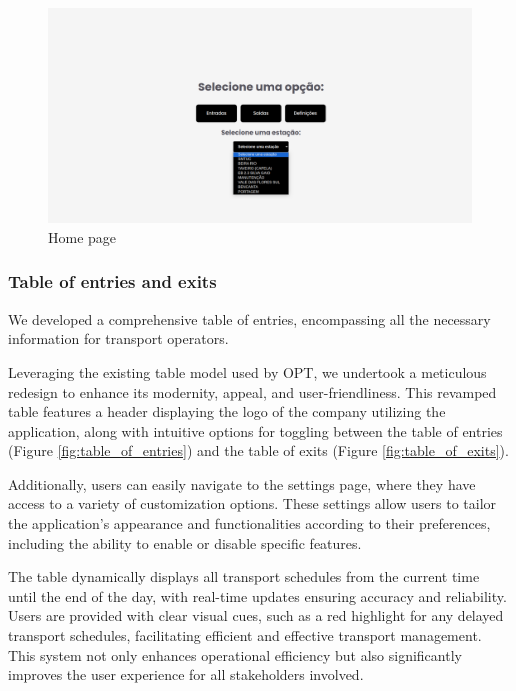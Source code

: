 \documentclass[10pt]{article}
\begin{document}
        \vfill
        \begin{figure}[htbp]
            \centering
            \includegraphics[width=1\textwidth]{home_page}
            \caption{Home page}
            \label{fig:home_page}
        \end{figure}

        \subsubsection{Table of entries and exits}

        We developed a comprehensive table of entries, encompassing all the necessary information for transport operators. 

        Leveraging the existing table model used by OPT, we undertook a meticulous redesign to enhance its modernity, appeal, and user-friendliness. This revamped table features a header displaying the logo of the company utilizing the application, along with intuitive options for toggling between the table of entries (Figure \ref{fig:table_of_entries}) and the table of exits (Figure \ref{fig:table_of_exits}).

        Additionally, users can easily navigate to the settings page, where they have access to a variety of customization options. These settings allow users to tailor the application's appearance and functionalities according to their preferences, including the ability to enable or disable specific features.

        The table dynamically displays all transport schedules from the current time until the end of the day, with real-time updates ensuring accuracy and reliability. Users are provided with clear visual cues, such as a red highlight for any delayed transport schedules, facilitating efficient and effective transport management. This system not only enhances operational efficiency but also significantly improves the user experience for all stakeholders involved.
\end{document}
